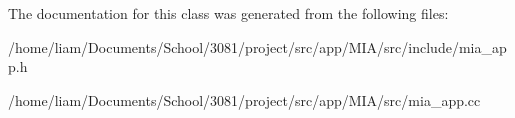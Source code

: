 The documentation for this class was generated from the following files\+:\begin{DoxyCompactItemize}
\item 
/home/liam/\+Documents/\+School/3081/project/src/app/\+M\+I\+A/src/include/mia\+\_\+app.\+h\item 
/home/liam/\+Documents/\+School/3081/project/src/app/\+M\+I\+A/src/mia\+\_\+app.\+cc\end{DoxyCompactItemize}
